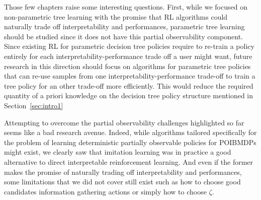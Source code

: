 Those few chapters raise some interesting questions.
First, while we focused on non-parametric tree learning with the promise that RL algorithms could naturally trade off interpretability and performances, parametric tree learning should be studied since it does not have this partial observability component.
Since existing RL for parametric decision tree policies \cite{silva,vos2024optimizinginterpretabledecisiontree,sympol} require to re-train a policy entirely for each interpretability-performance trade off a user might want, future research in this direction should focus on algorithms for parametric tree policies that can re-use samples from one interpretability-performance trade-off to train a tree policy for an other trade-off more efficiently.
This would reduce the required quantity of a priori knowledge on the decision tree policy structure mentioned in Section~\ref{sec:intro1}

Attempting to overcome the partial observability challenges highlighted so far seems like a bad research avenue.
Indeed, while algorithms tailored specifically for the problem of learning deterministic partially observable policies for POIBMDPs might exist, we clearly saw that imitation learning was in practice a good alternative to direct interpretable reinforcement learning.
And even if the former makes the promise of naturally trading off interpretability and performances, some limitations that we did not cover still exist such as how to choose good candidates information gathering actions or simply how to choose $\zeta$.
